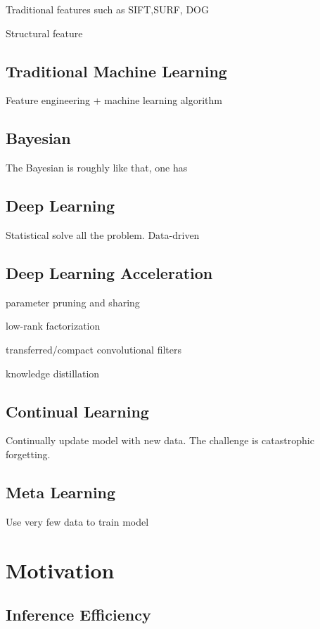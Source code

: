\documentclass[11pt]{article} 	%
\theoremstyle{definition}
\begin{document}
Traditional features such as SIFT,SURF,  DOG

Structural feature

\subsection{Traditional Machine Learning}

Feature engineering + machine learning algorithm


\subsection{Bayesian}

The Bayesian is roughly like that, one has 

\subsection{Deep Learning}

Statistical solve all the problem.  Data-driven

\subsection{Deep Learning Acceleration}

parameter pruning and sharing

low-rank factorization

transferred/compact convolutional filters

knowledge distillation



\subsection{Continual Learning}
Continually update model with new data.  The challenge is catastrophic forgetting.

\subsection{Meta Learning}
Use very few data to train model



\section{Motivation}

\subsection{Inference Efficiency}
\end{document}
